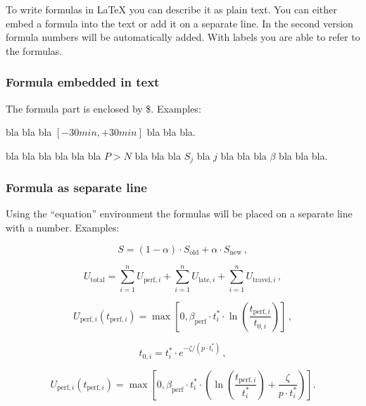To write formulas in \LaTeX{} you can describe it as plain text.
You can either embed a formula into the text or add it on a separate
line.
In the second version formula numbers will be automatically added.
With labels you are able to refer to the formulas.

\subsubsection{Formula embedded in text}

The formula part is enclosed by \$. Examples:

bla bla bla $[-30min,+30min]$ bla bla bla.

bla bla bla bla bla bla $P > N$ bla bla bla $S_{j}$ bla $j$ bla bla
bla  $\beta$ bla bla bla.

\subsubsection{Formula as separate line}

Using the ``equation'' environment the formulas will be placed on a
separate line with a number. Examples:

\begin{equation}\label{eq:score-averaging}
  S = (1 - \alpha) \cdot S_\text{old} + \alpha \cdot S_\text{new}\,,
\end{equation}

\begin{equation}\label{eq:utility-total}
  U_\text{total} = \sum_{i=1}^{n} U_{\text{perf},i} + \sum_{i=1}^{n} U_{\text{late},i}
              + \sum_{i=1}^{n} U_{\text{travel},i}\,,
\end{equation}

\begin{equation}\label{eq:utility-perform}
  U_{\text{perf},i}(t_{\text{perf},i}) = \max \left[ 0 , \beta_{\text{perf}} \cdot
t^{*}_{i} \cdot
                \ln \left( \frac{t_{\text{perf},i}}{t_{0,i}} \right)
\right]\,,
\end{equation}

\begin{equation}\label{eq:typical-duration}
  t_{0,i} = t^{*}_{i} \cdot e^{-\zeta / (p \cdot t^{*}_i)}\,,
\end{equation}

\begin{equation}\label{eq:utility-perform-resolved}
  U_{\text{perf},i}(t_{\text{perf},i}) = 
      \max\left[ 0 , \beta_\text{perf} \cdot t^{*}_{i} \cdot
      \left( \ln\left( \frac{t_{\text{perf},i}}{t^{*}_{i}} \right) +
      \frac{\zeta}{p \cdot t^{*}_i} \right) \right].
\end{equation}

